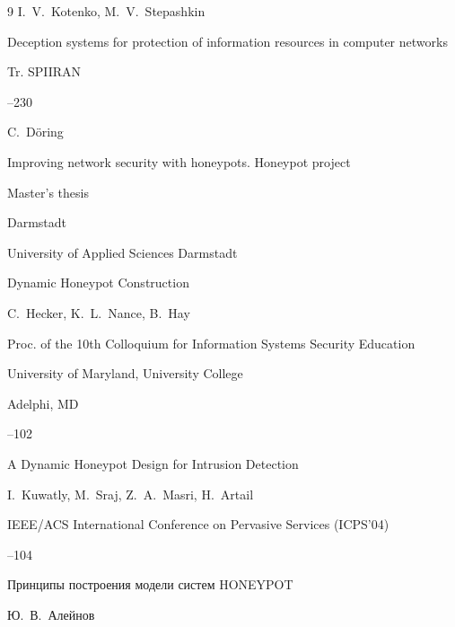 \begin{thebibliography}{9}
\by I.~V.~Kotenko, M.~V.~Stepashkin

\paper Deception systems for protection of information resources in computer networks

\jour Tr. SPIIRAN




--230




\by C.~D\"oring

\thesis Improving network security with honeypots. Honeypot project 

\thesisinfo Master's thesis

\publaddr Darmstadt

\publ University of Applied Sciences Darmstadt






\paper Dynamic Honeypot Construction

\by C.~Hecker, K.~L.~Nance, B.~Hay

\inbook Proc. of the 10th Colloquium for Information Systems Security Education

\publ University of Maryland, University College 

\publaddr Adelphi, MD


--102




\paper A Dynamic Honeypot Design for Intrusion Detection

\by  	I.~Kuwatly, M.~Sraj, Z.~A.~Masri,	H.~Artail

 IEEE/ACS International Conference on Pervasive Services (ICPS'04)


--104







\paper Принципы построения модели систем HONEYPOT

\by Ю.~В.~Алейнов


\end{thebibliography}
